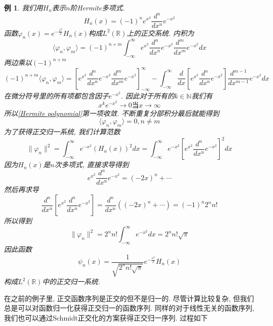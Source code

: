 \documentclass[a4paper,11pt]{book}
\newtheorem{example}{例}[section]
\begin{document}
\begin{example}
  我们用$H_n$表示$n$阶Hermite多项式.
  \begin{equation*}
    H_n(x)=(-1)^ne^{x^2}\frac{d^n}{dx^n}e^{-x^2}
  \end{equation*}
  函数$\varphi_n(x)=e^{-\frac{x^2}{2}}H_n(x)$构成$L^2(\mathbb{R})$上的正交系统. 内积为
  \begin{equation*}
    \langle\varphi_n,\varphi_m\rangle=(-1)^{n+m}\int_{-\infty}^{\infty}e^{x^2}\frac{d^n}{dx^n}e^{-x^2}\frac{d^m}{dx^m}e^{-x^2}dx
  \end{equation*}
  两边乘以$(-1)^{n+m}$
  \begin{equation}\label{Hermite polynomial}
    (-1)^{n+m}\langle\varphi_n,\varphi_m\rangle=\left[ e^{x^2}\frac{d^n}{dx^n}e^{-x^2}\frac{d^m}{dx^m}e^{-x^2}\right]^{\infty}_{-\infty}-\int_{-\infty}^{\infty}\frac{d}{dx}\left[e^{x^2}\frac{d^n}{dx^n}e^{-x^2}\right]\frac{d^{m-1}}{dx^{m-1}}e^{-x^2}dx
  \end{equation}
  在微分符号里的所有项都包含因子$e^{-x^2}$. 因此对于所有的$k\in \mathbb{N}$我们有
  \begin{equation*}
    x^ke^{-x^2}\to 0\text{当}x\to\infty
  \end{equation*}
  所以\eqref{Hermite polynomial}第一项收敛. 不断重复分部积分最后就能得到
  \begin{equation*}
    \langle\varphi_n,\varphi_m\rangle=0, n\neq m
  \end{equation*}
  为了获得正交归一系统, 我们计算范数
  \begin{equation*}
    \|\varphi_n\|^2=\int_{-\infty}^{\infty}e^{-x^2}(H_n(x))^2dx=\int_{-\infty}^{\infty}e^{-x^2}\left[e^{x^2}\frac{d^n}{dx^n}e^{-x^2}\right]^2dx
  \end{equation*}
  因为$H_n(x)$是$n$次多项式, 直接求导得到
  \begin{equation*}
    e^{x^2}\frac{d^n}{dx^n}e^{-x^2}=(-2x)^n+\cdots
  \end{equation*}
  然后再求导
  \begin{equation*}
    \frac{d^n}{dx^n}\left[e^{x^2}\frac{d^n}{dx^n}e^{-x^2}\right]=\frac{d^n}{dx^n}((-2x)^n+\cdots)=(-1)^n2^nn!
  \end{equation*}
  所以得到
  \begin{equation*}
    \|\varphi_n\|^2=2^nn!\int_{-\infty}^{\infty}e^{-x^2}dx=2^nn!\sqrt{\pi}
  \end{equation*}
  因此函数
  \begin{equation*}
    \psi_n(x)=\frac{1}{\sqrt{2^nn!\sqrt{\pi}}}e^{-\frac{x^2}{2}}H_n(x)
  \end{equation*}
  构成$L^2(\mathbb{R})$中的正交归一系统.
\end{example}
在之前的例子里, 正交函数序列是正交的但不是归一的. 尽管计算比较复杂, 但我们总是可以对函数归一化获得正交归一的函数序列. 同样的对于线性无关的函数序列, 我们也可以通过Schmidt正交化的方案获得正交归一序列. 过程如下
\end{document}
